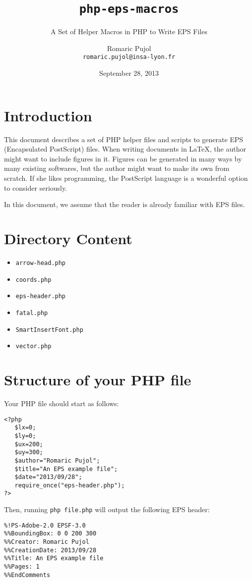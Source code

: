 \documentclass[a4paper]{scrartcl}
\title{\texttt{php-eps-macros}}
\subtitle{A Set of Helper Macros in PHP to Write EPS Files}
\author{Romaric Pujol\\\footnotesize{\texttt{romaric.pujol@insa-lyon.fr}}}
\date{September 28, 2013}
\newcommand\code[1]{\lstinline{#1}}
\begin{document}
\maketitle
\section{Introduction}
This document describes a set of PHP helper files and scripts to generate EPS
   (Encapsulated PostScript) files.
When writing documents in \LaTeX, the author might want to include figures in
   it.
Figures can be generated in many ways by many existing softwares, but the
   author might want to make its own from scratch.
If she likes programming, the PostScript language is a wonderful option to
   consider seriously.

In this document, we assume that the reader is already familiar with EPS files.

\section{Directory Content}
\begin{itemize}
\item \texttt{arrow-head.php}
\item \texttt{coords.php}
\item \texttt{eps-header.php}
\item \texttt{fatal.php}
\item \texttt{SmartInsertFont.php}
\item \texttt{vector.php}
\end{itemize}

\section{Structure of your PHP file}
Your PHP file should start as follows:
\lstset{language=PHP}
\begin{lstlisting}
<?php
   $lx=0;
   $ly=0;
   $ux=200;
   $uy=300;
   $author="Romaric Pujol";
   $title="An EPS example file";
   $date="2013/09/28";
   require_once("eps-header.php");
?>
\end{lstlisting}

Then, running \code{php file.php} will output the following EPS header:
\begin{lstlisting}
%!PS-Adobe-2.0 EPSF-3.0
%%BoundingBox: 0 0 200 300
%%Creator: Romaric Pujol
%%CreationDate: 2013/09/28
%%Title: An EPS example file
%%Pages: 1
%%EndComments
\end{lstlisting}
\end{document}
